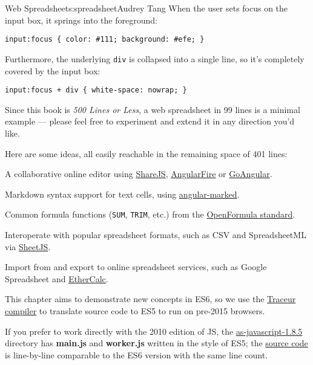 \begin{aosachapter}{Web Spreadsheet}{s:spreadsheet}{Audrey Tang}
When the user sets focus on the input box, it springs into the
foreground:

\begin{verbatim}
input:focus { color: #111; background: #efe; }
\end{verbatim}

Furthermore, the underlying \texttt{div} is collapsed into a single
line, so it's completely covered by the input box:

\begin{verbatim}
input:focus + div { white-space: nowrap; }
\end{verbatim}

\label{conclusion}

Since this book is \emph{500 Lines or Less}, a web spreadsheet in 99
lines is a minimal example --- please feel free to experiment and extend
it in any direction you'd like.

Here are some ideas, all easily reachable in the remaining space of 401
lines:

\begin{aosaitemize}

\item
  A collaborative online editor using
  \href{http://sharejs.org/}{ShareJS},
  \href{http://angularfire.com}{AngularFire} or
  \href{http://goangular.org/}{GoAngular}.
\item
  Markdown syntax support for text cells, using
  \href{http://ngmodules.org/modules/angular-marked}{angular-marked}.
\item
  Common formula functions (\texttt{SUM}, \texttt{TRIM}, etc.) from the
  \href{https://en.wikipedia.org/wiki/OpenFormula}{OpenFormula
  standard}.
\item
  Interoperate with popular spreadsheet formats, such as CSV and
  SpreadsheetML via \href{http://sheetjs.com/}{SheetJS}.
\item
  Import from and export to online spreadsheet services, such as Google
  Spreadsheet and \href{http://ethercalc.net/}{EtherCalc}.
\end{aosaitemize}

\label{a-note-on-js-versions}

This chapter aims to demonstrate new concepts in ES6, so we use the
\href{https://github.com/google/traceur-compiler}{Traceur compiler} to
translate source code to ES5 to run on pre-2015 browsers.

If you prefer to work directly with the 2010 edition of JS, the
\href{https://audreyt.github.io/500lines/spreadsheet/as-javascript-1.8.5/}{as-javascript-1.8.5}
directory has \textbf{main.js} and \textbf{worker.js} written in the
style of ES5; the
\href{https://github.com/audreyt/500lines/tree/master/spreadsheet/as-javascript-1.8.5}{source
code} is line-by-line comparable to the ES6 version with the same line
count.


\end{aosachapter}
